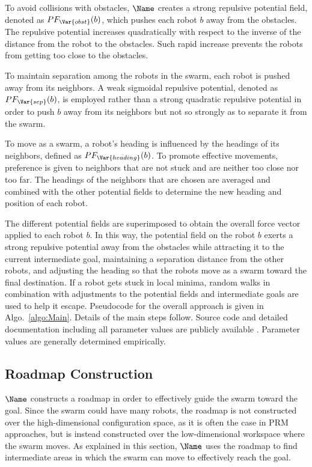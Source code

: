 To avoid collisions with obstacles, $\Name$ creates a strong repulsive potential
field, denoted as $PF_\Var{obst}(b)$, which
pushes each robot $b$ away from the obstacles. The repulsive potential
increases quadratically with respect to the inverse of the distance
from the robot to the obstacles. Such rapid increase prevents the robots
from getting too close to the obstacles. 

To maintain separation among the robots in the swarm, each robot is
pushed away from its neighbors. A weak sigmoidal repulsive
potential, denoted as $PF_\Var{sep}(b)$, is employed rather than a
strong quadratic repulsive potential in order to push $b$ away
from its neighbors but not so strongly as to separate it from the
swarm.

To move as a swarm, a robot's heading is influenced by the headings of
its neighbors, defined as $PF_\Var{heading}(b)$. To promote effective
movements, preference is given to neighbors that are not
stuck and are neither too close nor too far. The headings of the
neighbors that are chosen are averaged and combined with the other
potential fields to determine the new heading and position of each
robot.






The different potential fields are superimposed to obtain the overall
force vector applied to each robot $b$. In this way, the potential
field on the robot $b$ exerts a strong repulsive potential away from
the obstacles while attracting it to the current intermediate goal,
maintaining a separation distance from the other robots, and adjusting
the heading so that the robots move as a swarm toward the final
destination. If a robot gets stuck in local minima, random walks in
combination with adjustments to the potential fields and intermediate
goals are used to help it escape.  Pseudocode for the overall approach
is given in Algo.~\ref{algo:Main}. Details of the main steps
follow. Source code and detailed documentation including all parameter
values are publicly available \cite{CodeBoids}. Parameter values are
generally determined empirically.

\subsection{Roadmap Construction}
\label{sec:RM}

 $\Name$ constructs a roadmap in order to effectively guide the swarm
toward the goal. Since the swarm could have many robots, the roadmap
is not constructed over the high-dimensional configuration
space, as it is often the case in PRM approaches, but is instead
constructed over the low-dimensional workspace where the swarm
moves. As explained in this section, $\Name$ uses the roadmap to find
intermediate areas in which the swarm can move to effectively reach
the goal.


